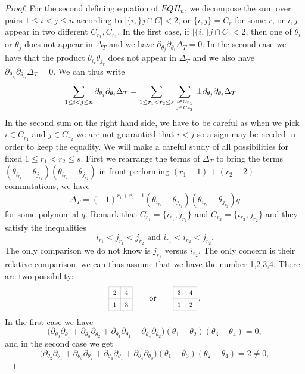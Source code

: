\documentclass[11pt]{amsart}
\theoremstyle{definition}
\numberwithin{equation}{section}
\begin{document}
\begin{proof}
For the second defining equation of $EQH_n $, we decompose the sum over pairs $1\le i<j\le n$ according to $|\{i,\}j\cap C|<2$, or $\{i,j\}=C_r$ for some $r$, or $i,j$ appear in two different $C_{r_1},C_{r_2}$. In the first case, if  $|\{i,\}j\cap C|<2$, then one of $\theta_i$ or $\theta_j$ does not appear in $\Delta_T$ and we have $ \partial_{\theta_j} \partial_{\theta_i}\Delta_T=0$. In the second case we have that the product $\theta_{i_r}\theta_{j_r}$ does not appear in $\Delta_T$ and we also have $ \partial_{\theta_{j_r}} \partial_{\theta_{i_r}}\Delta_T=0$.
We can thus write
\begin{align*}
 \sum_{1\le i<j\le n} \partial_{\theta_j}\partial_{\theta_i}\Delta_T&= \sum_{1\le r_1<r_2\le s} \sum_{i\in C_{r_1} \atop j\in C_{r_2}} \pm  \partial_{\theta_j}\partial_{\theta_i}\Delta_T
\end{align*}
In the second sum on the right hand side, we have to be careful as when we pick $i\in C_{r_1}$ and $ j\in C_{r_2}$ we are not guarantied that $i<j$ so a sign may be needed 
in  order to keep the equality. We will make a careful study of all possibilities for fixed $1\le r_1<r_2\le s$. First we rearrange the terms of $\Delta_T$ to  bring the terms 
$(\theta_{i_{r_1}}-\theta_{j_{r_1}})(\theta_{i_{r_2}}-\theta_{j_{r_2}})$ in front  performing $(r_1-1)+(r_2-2)$ commutations, we have 
  $$\Delta_T  =(-1)^{r_1+r_2-1}(\theta_{i_{r_1}}-\theta_{j_{r_1}})(\theta_{i_{r_2}}-\theta_{j_{r_2}})q$$
  for some polynomial $q$. Remark that $C_{r_1}=\{i_{r_1},j_{r_1}\}$ and $C_{r_2}=\{i_{r_2},j_{r_2}\}$ and they satisfy the inequalities
  $$  i_{r_1} < j_{r_1} < j_{r_2} \text{ and  }  i_{r_1} < i_{r_2} < j_{r_2}.$$
  The only comparison we do not know is  $ j_{r_1}$ versus  $i_{r_2}$. The only concern is their relative comparison, we can thus assume that we have the number 1,2,3,4.
  There are two possibility:
  $$
\begin{tikzpicture}[scale=0.5,baseline=12pt] 
	\draw[help lines] (0,0) grid (2,2);
	\node at (.5,.5){$\scriptstyle 1$};
	\node at (.5,1.5){$\scriptstyle 2$};
	\node at (1.5,.5){$\scriptstyle 3$};
	\node at (1.5,1.5){$\scriptstyle 4$};
\end{tikzpicture}
\qquad\text{or} \qquad
  \begin{tikzpicture}[scale=0.5,baseline=12pt] 
	\draw[help lines] (0,0) grid (2,2);
	\node at (.5,.5){$\scriptstyle 1$};
	\node at (.5,1.5){$\scriptstyle 3$};
	\node at (1.5,.5){$\scriptstyle 2$};
	\node at (1.5,1.5){$\scriptstyle 4$};
\end{tikzpicture}\,.
$$
In the first case we have
$$ \big( \partial_{\theta_3}\partial_{\theta_1} +  \partial_{\theta_3}\partial_{\theta_2} +  \partial_{\theta_4}\partial_{\theta_1} +  \partial_{\theta_4}\partial_{\theta_2}\big)
     (\theta_{1}-\theta_{2})(\theta_{3}-\theta_{4}) =0,
$$  
 and in the second case we get 
$$ \big( \partial_{\theta_2}\partial_{\theta_1} +  \partial_{\theta_3}\partial_{\theta_2} +  \partial_{\theta_4}\partial_{\theta_1} +  \partial_{\theta_4}\partial_{\theta_3}\big)
     (\theta_{1}-\theta_{3})(\theta_{2}-\theta_{4}) =2 \ne 0,
$$  


\end{proof}
\end{document}
